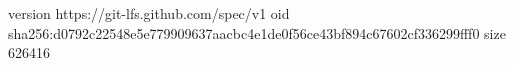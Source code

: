 version https://git-lfs.github.com/spec/v1
oid sha256:d0792c22548e5e779909637aacbc4e1de0f56ce43bf894c67602cf336299fff0
size 626416
